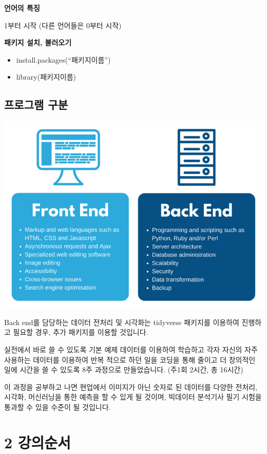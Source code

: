 \documentclass[
  letterpaper,
  DIV=11,
  numbers=noendperiod]{scrartcl}
\begin{document}
\textbf{언어의 특징}

1부터 시작 (다른 언어들은 0부터 시작)

\textbf{패키지 설치, 불러오기}

\begin{itemize}
\item
  install.packages(``패키지이름'')
\item
  library(패키지이름)
\end{itemize}

\subsection{프로그램 구분}\label{uxd504uxb85cuxadf8uxb7a8-uxad6cuxbd84}

\includegraphics{typst2_files/mediabag/img.png}

Back end를 담당하는 데이터 전처리 및 시각화는 tidyverse 패키지를
이용하여 진행하고 필요할 경우, 추가 패키지를 이용할 것입니다.

실전에서 바로 쓸 수 있도록 기본 예제 데이터를 이용하여 학습하고 각자
자신의 자주 사용하는 데이터를 이용하여 반복 적으로 하던 일을 코딩을 통해
줄이고 더 창의적인 일에 시간을 쓸 수 있도록 8주 과정으로 만들었습니다.
(주1회 2시간, 총 16시간)

이 과정을 공부하고 나면 현업에서 이미지가 아닌 숫자로 된 데이터를 다양한
전처리, 시각화, 머신러닝을 통한 예측을 할 수 있게 될 것이며, 빅데이터
분석기사 필기 시험을 통과할 수 있을 수준이 될 것입니다.

\section{2 강의순서}\label{uxac15uxc758uxc21cuxc11c}
\end{document}

